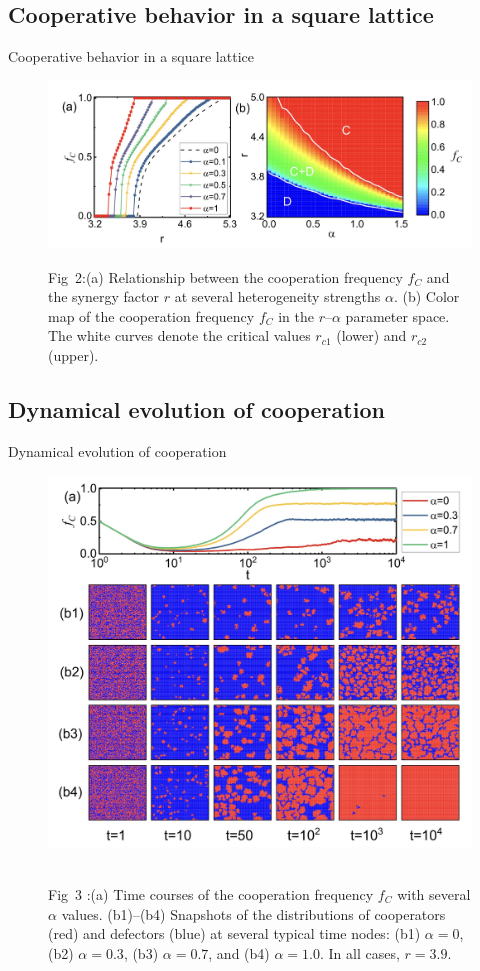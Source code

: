 \documentclass[notheorems,11pt,compress]{beamer}
\numberwithin{figure}{section}
\numberwithin{table}{section}
\numberwithin{equation}{section}
\theoremstyle{plain}
\numberwithin{theorem}{section}
\numberwithin{definition}{section}
\numberwithin{lemma}{section}
\numberwithin{proposition}{section}
\numberwithin{corollary}{section}
\theoremstyle{example}
\begin{document}
\subsection{Cooperative behavior in a square lattice}

\begin{frame}{Cooperative behavior in a square lattice}

	\begin{figure}[H]
		\centering
		\includegraphics[width=1\linewidth]{2}
		\parbox{.8\textwidth}{Fig\ 2:(a) Relationship between the cooperation frequency $f_C$ and the synergy factor $r$ at several heterogeneity strengths $\alpha$.
			(b) Color map of the cooperation frequency $f_C$ in the $r–\alpha$ parameter space.
			The white curves denote the critical values $r_{c1}$ (lower) and $r_{c2}$ (upper).}
		\label{fig2}
	\end{figure}
\end{frame}


\subsection{Dynamical evolution of cooperation
}
\begin{frame}{Dynamical evolution of cooperation
	}
	\begin{figure}[H]
		\centering
		\includegraphics[width=.65\linewidth]{3}
		\label{fig3}
		\,
		\parbox{.3\textwidth}{\scriptsize Fig\ 3 :(a) Time courses of the cooperation frequency $f_C$ with several $\alpha$ values. (b1)–(b4) Snapshots of the distributions of cooperators (red) and defectors (blue) at several typical time nodes: (b1) $\alpha = 0$, (b2) $\alpha = 0.3$, (b3) $\alpha = 0.7$, and (b4) $\alpha = 1.0$. In all cases, $r = 3.9$.
			\vspace*{10em}
		}
	\end{figure}
\end{frame}
\end{document}
